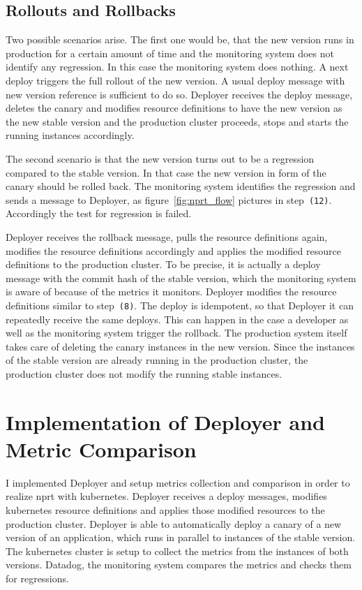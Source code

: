 \section{Rollouts and Rollbacks}

Two possible scenarios arise. The first one would be, that the new version runs in
production for a certain amount of time and the monitoring system does not identify any
regression. In this case the monitoring system does nothing. A next deploy triggers the
full rollout of the new version. A usual deploy message with new version reference is
sufficient to do so. Deployer receives the deploy message, deletes the canary and modifies
resource definitions to have the new version as the new stable version and the production
cluster proceeds, stops and starts the running instances accordingly.

The second scenario is that the new version turns out to be a regression compared to the
stable version. In that case the new version in form of the canary should be rolled
back. The monitoring system identifies the regression and sends a message to Deployer, as
figure~\ref{fig:nprt_flow} pictures in step~\texttt{(12)}. Accordingly the test for
regression is failed.

Deployer receives the rollback message, pulls the resource definitions again, modifies the
resource definitions accordingly and applies the modified resource definitions to the
production cluster. To be precise, it is actually a deploy message with the commit
hash of the stable version, which the monitoring system is aware of because of the metrics
it monitors. Deployer modifies the resource definitions similar to step~\texttt{(8)}. The
deploy is idempotent, so that Deployer it can repeatedly receive the same deploys. This
can happen in the case a developer as well as the monitoring system trigger the
rollback. The production system itself takes care of deleting the canary instances in the
new version. Since the instances of the stable version are already running in the
production cluster, the production cluster does not modify the running stable instances.

\chapter{Implementation of Deployer and Metric Comparison}
\label{chap:detail}

I implemented Deployer and setup metrics collection and comparison in order to realize
\gls{nprt} with kubernetes. Deployer receives a deploy messages, modifies kubernetes
resource definitions and applies those modified resources to the production
cluster. Deployer is able to automatically deploy a canary of a new version of an
application, which runs in parallel to instances of the stable version. The kubernetes
cluster is setup to collect the metrics from the instances of both versions. Datadog, the
monitoring system compares the metrics and checks them for regressions.


